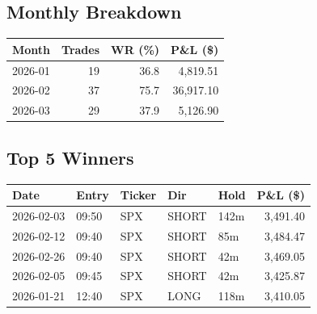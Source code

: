 \documentclass[11pt,a4paper,twoside]{article}
\begin{document}
\subsection*{Monthly Breakdown}
\noindent\begin{center}
\begin{tabular}{>{\color{txtmain}}l rrr}
\toprule
\rowcolor{cardbg}
\textbf{Month} & \textbf{Trades} & \textbf{WR (\%)} & \textbf{P\&L (\$)} \\
\midrule
2026-01 & 19 & 36.8 & \textcolor{wingreen}{4,819.51} \\
2026-02 & 37 & 75.7 & \textcolor{wingreen}{36,917.10} \\
2026-03 & 29 & 37.9 & \textcolor{wingreen}{5,126.90} \\
\bottomrule
\end{tabular}
\end{center}
\subsection*{Top 5 Winners}
\noindent\begin{center}
\begin{tabular}{>{\color{txtmain}}l llll r}
\toprule
\rowcolor{cardbg}
\textbf{Date} & \textbf{Entry} & \textbf{Ticker} & \textbf{Dir} & \textbf{Hold} & \textbf{P\&L (\$)} \\
\midrule
2026-02-03 & 09:50 & SPX & SHORT & 142m & \textcolor{wingreen}{3,491.40} \\
2026-02-12 & 09:40 & SPX & SHORT & 85m & \textcolor{wingreen}{3,484.47} \\
2026-02-26 & 09:40 & SPX & SHORT & 42m & \textcolor{wingreen}{3,469.05} \\
2026-02-05 & 09:45 & SPX & SHORT & 42m & \textcolor{wingreen}{3,425.87} \\
2026-01-21 & 12:40 & SPX & LONG & 118m & \textcolor{wingreen}{3,410.05} \\
\bottomrule
\end{tabular}
\end{center}
\end{document}
